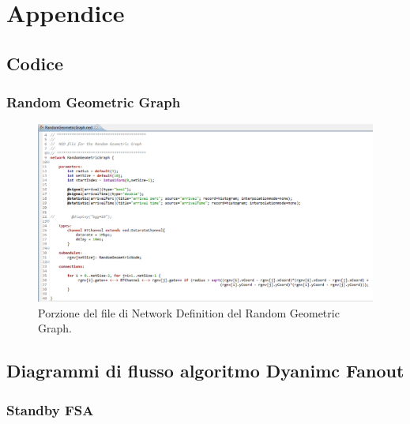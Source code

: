 \chapter{Appendice}
\label{apx:diagrammi_fsa}

\section{Codice}
\subsection{Random Geometric Graph}
\label{apx:rgg_code}

\begin{figure}[h]
	\centering
	\includegraphics[width=0.68\textheight, angle=90]{Images/omnet/codice_rgg}
	\caption[Codice RGG]{Porzione del file di Network Definition del Random Geometric Graph.}
	\label{fig:rgg_code}
\end{figure}
\newpage


\section{Diagrammi di flusso algoritmo Dyanimc Fanout}
\subsection{Standby FSA}
\label{apx:stb_fsa}

